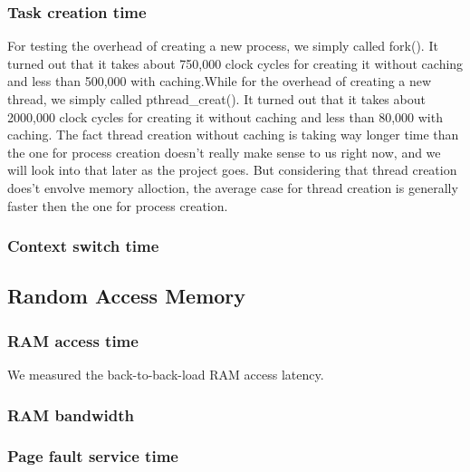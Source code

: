 \subsubsection{Task creation time}
For testing the overhead of creating a new process, we simply called fork(). It turned out that it takes about 750,000 clock cycles for creating it without caching and less than 500,000 with caching.While for the overhead of creating a new thread, we simply called pthread\_creat(). It turned out that it takes about 2000,000 clock cycles for creating it without caching and less than 80,000 with caching.
The fact thread creation without caching is taking way longer time than the one for process creation doesn't really make sense to us right now, and we will look into that later as the project goes. But considering that thread creation does't envolve memory alloction, the average case for thread creation is generally faster then the one for process creation.


\subsubsection{Context switch time}




\subsection{Random Access Memory}

\subsubsection{RAM access time}
We measured the back-to-back-load RAM access latency.




\subsubsection{RAM bandwidth}






\subsubsection{Page fault service time}



















